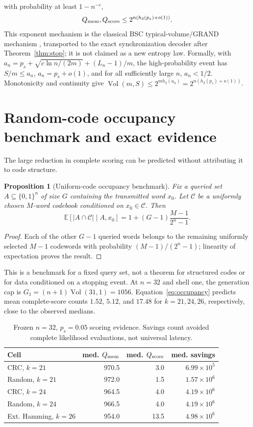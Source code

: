 \documentclass[conference]{IEEEtran}
\newtheorem{proposition}[theorem]{Proposition}
\newcommand{\C}{\mathcal C}
\newcommand{\Vol}{\operatorname{Vol}}
\begin{document}
with probability at least $1-n^{-c}$,
\begin{equation}
 Q_{\rm mem},Q_{\rm score}\le2^{n(h_2(p_s)+o(1))}. \label{eq:exponent}
\end{equation}
This exponent mechanism is the classical BSC typical-volume/GRAND mechanism
\cite{duffy2019grand}, transported to the exact synchronization decoder after Theorem~\ref{thm:stop};
it is not claimed as a new entropy law. Formally, with
$a_n=p_s+\sqrt{c\ln n/(2m)}+(L_n-1)/m$, the high-probability event has $S/m\le a_n$,
$a_n=p_s+o(1)$, and for all sufficiently large $n$, $a_n<1/2$. Monotonicity and continuity give
$\Vol(m,S)\le2^{m h_2(a_n)}=2^{n(h_2(p_s)+o(1))}$.

\section{Random-code occupancy benchmark and exact evidence}
The large reduction in complete scoring can be predicted without attributing it to code structure.
\begin{proposition}[Uniform-code occupancy benchmark]\label{prop:occupancy}
Fix a queried set $A\subseteq\{0,1\}^n$ of size $G$ containing the transmitted word $x_0$.
Let $\C$ be a uniformly chosen $M$-word codebook conditioned on $x_0\in\C$. Then
\begin{equation}
 \mathbb E[|A\cap\C|\mid A,x_0]
 =1+(G-1)\frac{M-1}{2^n-1}. \label{eq:occupancy}
\end{equation}
\end{proposition}
\begin{proof}
Each of the other $G-1$ queried words belongs to the remaining uniformly selected $M-1$ codewords
with probability $(M-1)/(2^n-1)$; linearity of expectation proves the result.
\end{proof}
This is a benchmark for a fixed query set, not a theorem for structured codes or for data conditioned
on a stopping event. At $n=32$ and shell one, the generation cap is
$G_1=(n+1)\Vol(31,1)=1056$. Equation~\eqref{eq:occupancy} predicts mean complete-score counts
$1.52$, $5.12$, and $17.48$ for $k=21,24,26$, respectively, close to the observed medians.

\begin{table}[t]
\caption{Frozen $n=32$, $p_s=0.05$ scoring evidence. Savings count avoided complete likelihood evaluations, not universal latency.}
\label{tab:n32}
\centering\scriptsize
\setlength{\tabcolsep}{3.0pt}\renewcommand{\arraystretch}{1.04}
\begin{tabular}{@{}lrrr@{}}
\toprule
Cell & med. $Q_{\rm mem}$ & med. $Q_{\rm score}$ & med. savings\\
\midrule
CRC, $k=21$ & 970.5 & 3.0 & $6.99\times10^5$\\
Random, $k=21$ & 972.0 & 1.5 & $1.57\times10^6$\\
CRC, $k=24$ & 964.5 & 4.0 & $4.19\times10^6$\\
Random, $k=24$ & 966.5 & 4.0 & $4.19\times10^6$\\
Ext. Hamming, $k=26$ & 954.0 & 13.5 & $4.98\times10^6$\\
\bottomrule
\end{tabular}
\end{table}
\end{document}
